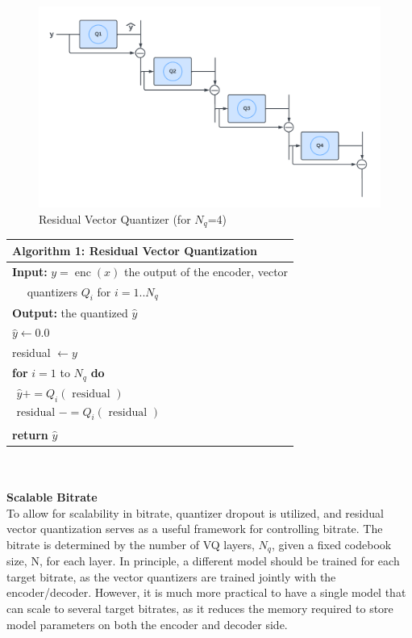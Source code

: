 \documentclass[12pt]{report}
\begin{document}
\\
\begin{figure}[H]
\includegraphics[width=1\textwidth]{Images/rvq.pdf}
\caption{Residual Vector Quantizer (for $N_q$=4)}
\end{figure}
\textbf{}
\begin{tabular}{l}
\hline \textbf{Algorithm 1:} Residual Vector Quantization \\
\hline \textbf{Input:} $y=\operatorname{enc}(x)$ the output of the encoder, vector \\
$\quad$ quantizers $Q_i$ for $i=1 . . N_q$ \\
\textbf{Output:} the quantized $\hat{y}$ \\
$\hat{y} \leftarrow 0.0$ \\
residual $\leftarrow y$ \\
\textbf{for} $i=1$ to $N_q$ \textbf{do} \\
\hspace{1.05cm}$\begin{array}{l}\hat{y}+=Q_i(\text { residual }) \\
\text {residual }-=Q_i(\text { residual })\end{array}$\\
\textbf{return} $\hat{y}$\\
\hline
\end{tabular}

\textbf{}\\\\
\textbf{Scalable Bitrate} \\
To allow for scalability in bitrate, quantizer dropout is utilized, and residual vector quantization serves as a useful framework for controlling bitrate. The bitrate is determined by the number of VQ layers, $N_q$, given a fixed codebook size, N, for each layer. In principle, a different model should be trained for each target bitrate, as the vector quantizers are trained jointly with the encoder/decoder. However, it is much more practical to have a single model that can scale to several target bitrates, as it reduces the memory required to store model parameters on both the encoder and decoder side.
\end{document}
